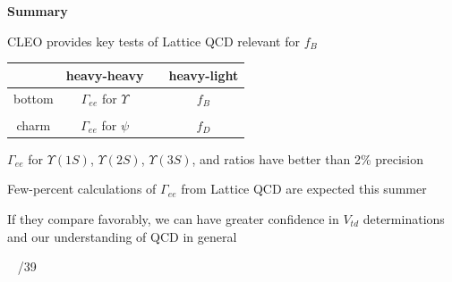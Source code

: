 \documentclass[landscape]{article}
\newenvironment{slide}[1][ ]{}{\mbox{ } \hfill \arabic{page}/39 \pagebreak}
\begin{document}
\begin{slide}
{\Huge \bf Summary}

\vspace{0.75 cm}
CLEO provides key tests of Lattice QCD relevant for $f_B$

\vfill
\begin{center}
  \renewcommand{\arraystretch}{1.5}
  \begin{tabular}{| c | c c c |}
    \hline & heavy-heavy & \mbox{\hspace{1 cm}} & heavy-light \\\hline
    \mbox{\hspace{0.5 cm}} bottom \mbox{\hspace{0.5 cm}} & $\Gamma_{ee}$ for $\Upsilon$ & & $f_B$ \\
    & & & \\
    \mbox{\hspace{0.5 cm}} charm \mbox{\hspace{0.5 cm}} & $\Gamma_{ee}$ for $\psi$ & & $f_D$ \\\hline
  \end{tabular}
\end{center}

\vfill
$\Gamma_{ee}$ for $\Upsilon(1S)$, $\Upsilon(2S)$, $\Upsilon(3S)$, and ratios have better than 2\% precision

\vfill
Few-percent calculations of $\Gamma_{ee}$ from Lattice QCD are expected this summer

\vfill
If they compare favorably, we can have greater confidence in $V_{td}$ determinations \\
and our understanding of QCD in general

\vfill
\end{slide}







\end{document}

